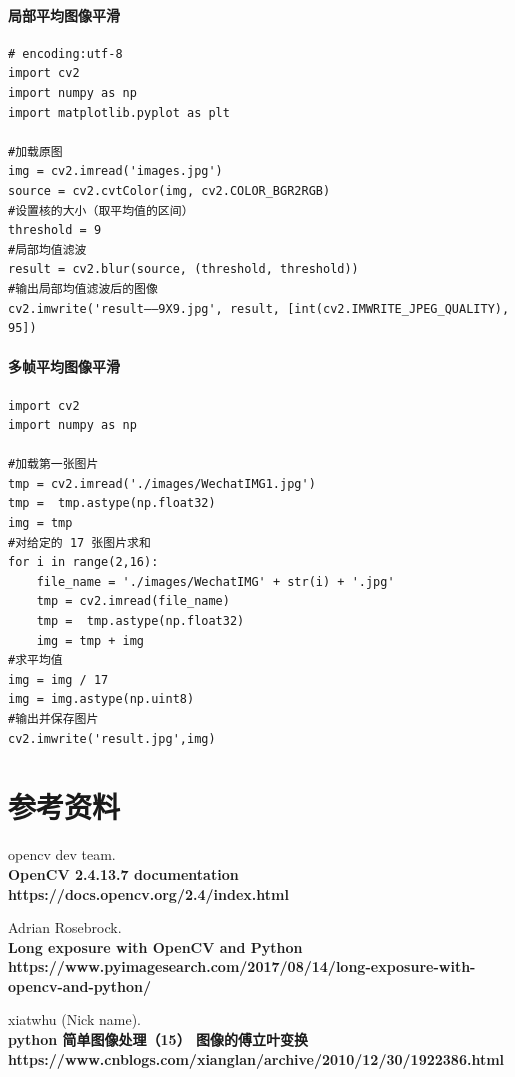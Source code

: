 \documentclass[11pt]{ctexart}
\begin{document}
\paragraph{局部平均图像平滑}

\lstset{language=python}
\begin{lstlisting}
# encoding:utf-8
import cv2
import numpy as np
import matplotlib.pyplot as plt
 
#加载原图
img = cv2.imread('images.jpg')
source = cv2.cvtColor(img, cv2.COLOR_BGR2RGB)
#设置核的大小（取平均值的区间）
threshold = 9
#局部均值滤波
result = cv2.blur(source, (threshold, threshold)) 
#输出局部均值滤波后的图像
cv2.imwrite('result——9X9.jpg', result, [int(cv2.IMWRITE_JPEG_QUALITY), 95])

\end{lstlisting}

\paragraph{多帧平均图像平滑}

\lstset{language=python}
\begin{lstlisting}
import cv2
import numpy as np

#加载第一张图片
tmp = cv2.imread('./images/WechatIMG1.jpg')
tmp =  tmp.astype(np.float32)
img = tmp
#对给定的 17 张图片求和
for i in range(2,16):
    file_name = './images/WechatIMG' + str(i) + '.jpg'
    tmp = cv2.imread(file_name)
    tmp =  tmp.astype(np.float32)
    img = tmp + img
#求平均值
img = img / 17
img = img.astype(np.uint8)
#输出并保存图片
cv2.imwrite('result.jpg',img)
\end{lstlisting}


\section{参考资料}

\begin{thebibliography}{99}

 opencv dev team.\\
{\bf OpenCV 2.4.13.7 documentation\\}
{\bf https://docs.opencv.org/2.4/index.html\\}

 Adrian Rosebrock.\\
{\bf Long exposure with OpenCV and Python\\}
{\bf https://www.pyimagesearch.com/2017/08/14/long-exposure-with-opencv-and-python/\\}

 xiatwhu (Nick name).\\
{\bf python 简单图像处理（15） 图像的傅立叶变换\\}
{\bf https://www.cnblogs.com/xianglan/archive/2010/12/30/1922386.html\\}

\end{thebibliography}
\end{document}
